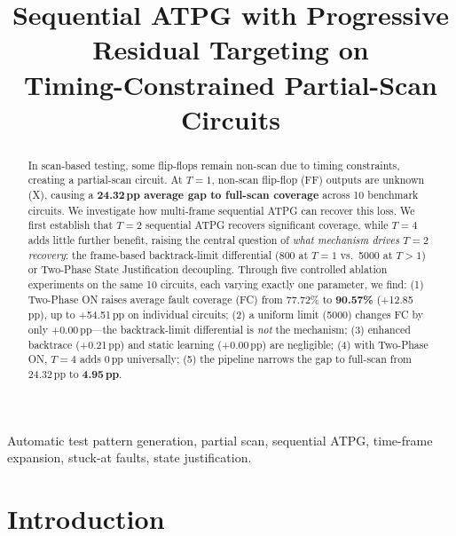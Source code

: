 \documentclass[conference]{IEEEtran}
\begin{document}
\title{Sequential ATPG with Progressive Residual Targeting on\\
Timing-Constrained Partial-Scan Circuits}

\author{
}

\maketitle

\begin{abstract}
In scan-based testing, some flip-flops remain non-scan due to timing
constraints, creating a partial-scan circuit. At $T{=}1$, non-scan flip-flop
(FF) outputs are unknown (X), causing a \textbf{24.32\,pp average gap to
full-scan coverage} across 10 benchmark circuits. We investigate how
multi-frame sequential ATPG can recover this loss. We first establish that
$T{=}2$ sequential ATPG recovers significant coverage, while $T{=}4$ adds
little further benefit, raising the central question of \emph{what mechanism
drives $T{=}2$ recovery}: the frame-based backtrack-limit differential
(800 at $T{=}1$ vs.\ 5000 at $T{>}1$) or Two-Phase State Justification
decoupling. Through five controlled ablation experiments on the same 10
circuits, each varying exactly one parameter, we find: (1) Two-Phase ON raises
average fault coverage (FC) from 77.72\% to \textbf{90.57\%} (+12.85\,pp),
up to +54.51\,pp on individual circuits; (2) a uniform limit (5000) changes FC by
only +0.00\,pp---the backtrack-limit differential is \emph{not} the mechanism;
(3) enhanced backtrace (+0.21\,pp) and static learning (+0.00\,pp) are
negligible; (4) with Two-Phase ON, $T{=}4$ adds 0\,pp universally; (5) the
pipeline narrows the gap to full-scan from 24.32\,pp to \textbf{4.95\,pp}.
\end{abstract}

\begin{IEEEkeywords}
Automatic test pattern generation, partial scan, sequential ATPG, time-frame
expansion, stuck-at faults, state justification.
\end{IEEEkeywords}

\section{Introduction}
\label{sec:intro}
\end{document}
